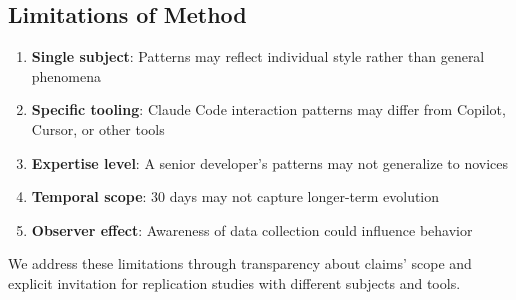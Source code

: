 \subsection{Limitations of Method}

\begin{enumerate}
    \item \textbf{Single subject}: Patterns may reflect individual style rather than general phenomena
    \item \textbf{Specific tooling}: Claude Code interaction patterns may differ from Copilot, Cursor, or other tools
    \item \textbf{Expertise level}: A senior developer's patterns may not generalize to novices
    \item \textbf{Temporal scope}: 30 days may not capture longer-term evolution
    \item \textbf{Observer effect}: Awareness of data collection could influence behavior
\end{enumerate}

We address these limitations through transparency about claims' scope and explicit invitation for replication studies with different subjects and tools.
